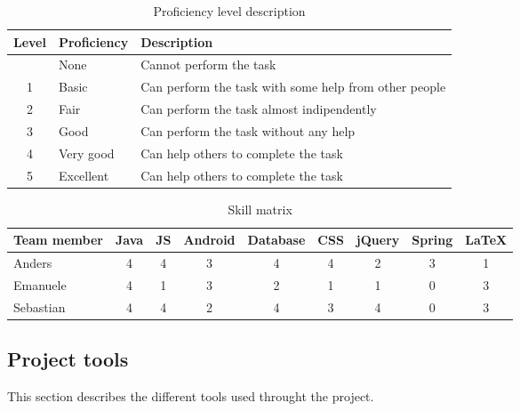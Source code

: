 \begin{table}[h]
\begin{center}
\begin{tabular}{ | c | l | l | }
  \hline
  Level & Proficiency & Description \\
  \hline\noalign{\smallskip}\noalign{\smallskip}\hline
  0 & None		  & Cannot perform the task \\
  1 & Basic     & Can perform the task with some help from other people \\
  2 & Fair		  & Can perform the task almost indipendently \\
  3 & Good		  & Can perform the task without any help \\
  4 & Very good	& Can help others to complete the task \\
  5 & Excellent	& Can help others to complete the task \\
  \hline
\end{tabular}
\end{center}
\caption{Proficiency level description}
\label{table:proficiency}
\end{table}

\begin{table}[h]
\begin{center}
\begin{tabular}{ | l | c | c | c | c | c | c | c | c | }
  \hline
  Team member & Java & JS & Android & Database & CSS & jQuery & Spring & LaTeX \\
  \hline\noalign{\smallskip}\noalign{\smallskip}\hline
  Anders & 4 & 4 & 3 & 4 & 4 & 2 & 3 & 1 \\
  Emanuele & 4 & 1 & 3 & 2 & 1 & 1 & 0 & 3 \\
  Sebastian & 4 & 4 & 2 & 4 & 3 & 4 & 0 & 3 \\
  \hline
\end{tabular}
\end{center}
\caption{Skill matrix}
\label{table:skillmatrix}
\end{table}



\subsection{Project tools}
\label{section:tools}
This section describes the different tools used throught the project.

